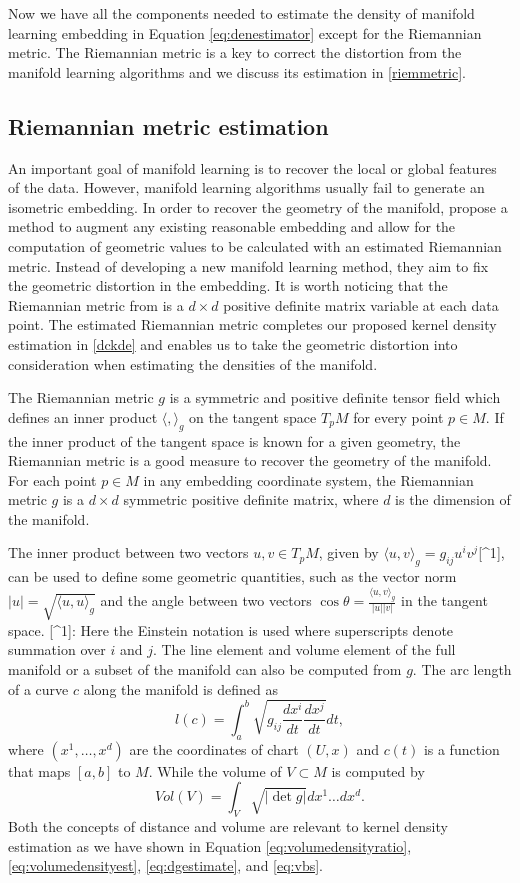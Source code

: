 \documentclass[11pt,a4paper,]{article}
\begin{document}
Now we have all the components needed to estimate the density of manifold learning embedding in Equation \eqref{eq:denestimator} except for the Riemannian metric. The Riemannian metric is a key to correct the distortion from the manifold learning algorithms and we discuss its estimation in \autoref{riemmetric}.

\hypertarget{riemmetric}{%
\subsection{Riemannian metric estimation}\label{riemmetric}}

An important goal of manifold learning is to recover the local or global features of the data. However, manifold learning algorithms usually fail to generate an isometric embedding.
In order to recover the geometry of the manifold, \textcite{Perrault-Joncas2013-pq} propose a method to augment any existing reasonable embedding and allow for the computation of geometric values to be calculated with an estimated Riemannian metric. Instead of developing a new manifold learning method, they aim to fix the geometric distortion in the embedding. It is worth noticing that the Riemannian metric from \textcite{Perrault-Joncas2013-pq} is a \(d\times d\) positive definite matrix variable at each data point. The estimated Riemannian metric completes our proposed kernel density estimation in \autoref{dckde} and enables us to take the geometric distortion into consideration when estimating the densities of the manifold.

The Riemannian metric \(g\) is a symmetric and positive definite tensor field which defines an inner product \(\langle,\rangle_g\) on the tangent space \(T_pM\) for every point \(p \in M\). If the inner product of the tangent space is known for a given geometry, the Riemannian metric is a good measure to recover the geometry of the manifold. For each point \(p\in M\) in any embedding coordinate system, the Riemannian metric \(g\) is a \(d\times d\) symmetric positive definite matrix, where \(d\) is the dimension of the manifold.

The inner product between two vectors \(u,v \in T_pM\), given by \(\langle u,v \rangle_g=g_{ij}u^iv^j\){[}\^{}1{]}, can be used to define some geometric quantities, such as the vector norm \(|u|=\sqrt{\langle u,u \rangle_g}\) and the angle between two vectors \(\cos{\theta}=\frac{\langle u,v \rangle_g}{|u| |v|}\) in the tangent space.
{[}\^{}1{]}: Here the Einstein notation is used where superscripts denote summation over \(i\) and \(j\).
The line element and volume element of the full manifold or a subset of the manifold can also be computed from \(g\). The arc length of a curve \(c\) along the manifold is defined as
\[
l(c)=\int_a^b \sqrt{g_{ij} \frac{dx^i}{dt} \frac{dx^j}{dt}} dt,
\]
where \((x^1,\dots,x^d)\) are the coordinates of chart \((U,x)\) and \(c(t)\) is a function that maps \([a,b]\) to \(M\). While the volume of \(V\subset M\) is computed by
\[
Vol(V)=\int_V \sqrt{|\det g|} dx^1\dots dx^d.
\]
Both the concepts of distance and volume are relevant to kernel density estimation as we have shown in Equation \eqref{eq:volumedensityratio}, \eqref{eq:volumedensityest}, \eqref{eq:dgestimate}, and \eqref{eq:vbs}.
\end{document}
